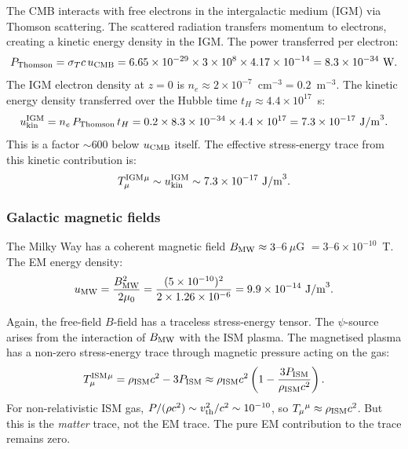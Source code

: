 \documentclass[11pt]{article}
\newcommand{\ee}[1]{\times 10^{#1}}
\begin{document}
The CMB interacts with free electrons in the intergalactic medium (IGM)
via Thomson scattering. The scattered radiation transfers momentum to
electrons, creating a kinetic energy density in the IGM. The power
transferred per electron:
\begin{equation}
P_{\rm Thomson} = \sigma_T c\,u_{\rm CMB} = 6.65\ee{-29}\times3\ee{8}
\times 4.17\ee{-14} = 8.3\ee{-34}~\text{W}.
\end{equation}
The IGM electron density at $z=0$ is $n_e \approx 2\ee{-7}$~cm$^{-3}
= 0.2$~m$^{-3}$. The kinetic energy density transferred over the
Hubble time $t_H \approx 4.4\ee{17}$~s:
\begin{equation}
u_{\rm kin}^{\rm IGM} = n_e\,P_{\rm Thomson}\,t_H
= 0.2\times8.3\ee{-34}\times4.4\ee{17}
= 7.3\ee{-17}~\text{J/m}^3.
\label{eq:u-kin-IGM}
\end{equation}
This is a factor $\sim 600$ below $u_{\rm CMB}$ itself. The effective
stress-energy trace from this kinetic contribution is:
\begin{equation}
T^{\rm IGM}_{\mu}{}^{\mu} \sim u_{\rm kin}^{\rm IGM}
\sim 7.3\ee{-17}~\text{J/m}^3.
\end{equation}

\subsubsection{Galactic magnetic fields}

The Milky Way has a coherent magnetic field $B_{\rm MW} \approx 3$--$6~\mu$G
$= 3$--$6\ee{-10}$~T. The EM energy density:
\begin{equation}
u_{\rm MW} = \frac{B_{\rm MW}^2}{2\mu_0}
= \frac{(5\ee{-10})^2}{2\times1.26\ee{-6}}
= 9.9\ee{-14}~\text{J/m}^3.
\label{eq:u-MW}
\end{equation}

Again, the free-field $B$-field has a traceless stress-energy tensor.
The $\psi$-source arises from the interaction of $B_{\rm MW}$ with
the ISM plasma. The magnetised plasma has a non-zero stress-energy
trace through magnetic pressure acting on the gas:
\begin{equation}
T^{\rm ISM}_{\mu}{}^{\mu} = \rho_{\rm ISM}c^2 - 3P_{\rm ISM}
\approx \rho_{\rm ISM}c^2\left(1 - \frac{3P_{\rm ISM}}{\rho_{\rm ISM}c^2}\right).
\end{equation}
For non-relativistic ISM gas, $P/(\rho c^2) \sim v_{\rm th}^2/c^2
\sim 10^{-10}$, so $T_{\mu}{}^{\mu} \approx \rho_{\rm ISM}c^2$.
But this is the \emph{matter} trace, not the EM trace. The pure EM
contribution to the trace remains zero.
\end{document}
